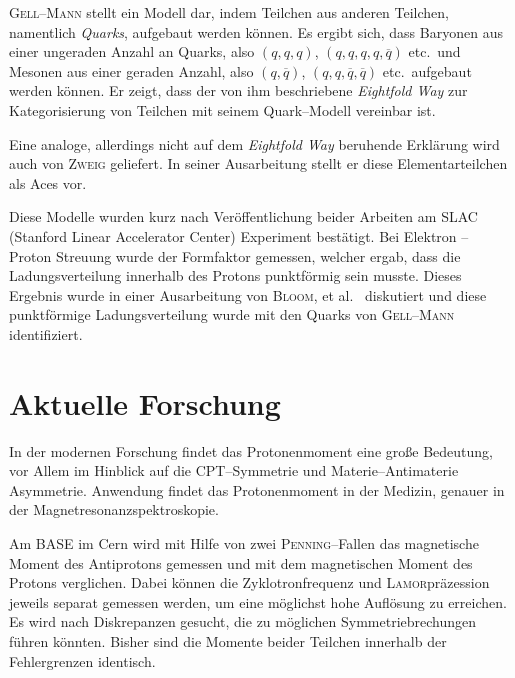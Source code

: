 \documentclass[sn-mathphys-num,iicol]{sn-jnl}
\theoremstyle{thmstyleone}
\theoremstyle{thmstyletwo}
\theoremstyle{thmstylethree}
\begin{document}
\textsc{Gell--Mann}\cite{Gellmann1964} stellt ein Modell dar, indem Teilchen aus anderen Teilchen, namentlich \textit{Quarks}, aufgebaut werden können.
Es ergibt sich, dass Baryonen aus einer ungeraden Anzahl an Quarks, also $\left(q,q,q\right)$, $\left(q,q,q,q,\overline{q}\right)$ etc.\ und Mesonen aus einer geraden Anzahl, also $\left(q,\overline{q}\right)$, $\left(q,q,\overline{q},\overline{q}\right)$ etc.\ aufgebaut werden können.
Er zeigt, dass der von ihm beschriebene \textit{Eightfold Way} zur Kategorisierung von Teilchen mit seinem Quark--Modell vereinbar ist.

Eine analoge, allerdings nicht auf dem \textit{Eightfold Way} beruhende Erklärung wird auch von \textsc{Zweig}\cite{Zweig1964} geliefert.
In seiner Ausarbeitung stellt er diese Elementarteilchen als Aces vor.

Diese Modelle wurden kurz nach Veröffentlichung beider Arbeiten am SLAC (Stanford Linear Accelerator Center) Experiment bestätigt.\cite{Bloom1969}
Bei Elektron -- Proton Streuung wurde der Formfaktor gemessen, welcher ergab, dass die Ladungsverteilung innerhalb des Protons punktförmig sein musste.
Dieses Ergebnis wurde in einer Ausarbeitung von \textsc{Bloom}, et al.\ \cite{Bloom1969} diskutiert und diese punktförmige Ladungsverteilung wurde mit den Quarks von \textsc{Gell--Mann} identifiziert.

\section{Aktuelle Forschung}
In der modernen Forschung findet das Protonenmoment eine große Bedeutung, vor Allem im Hinblick auf die CPT--Symmetrie und Materie--Antimaterie Asymmetrie.
Anwendung findet das Protonenmoment in der Medizin, genauer in der Magnetresonanzspektroskopie.

Am BASE im Cern\cite{BASE2017} wird mit Hilfe von zwei \textsc{Penning}--Fallen das magnetische Moment des Antiprotons gemessen und mit dem magnetischen Moment des Protons verglichen.
Dabei können die Zyklotronfrequenz und \textsc{Lamor}präzession jeweils separat gemessen werden, um eine möglichst hohe Auflösung zu erreichen.
Es wird nach Diskrepanzen gesucht, die zu möglichen Symmetriebrechungen führen könnten.
Bisher sind die Momente beider Teilchen innerhalb der Fehlergrenzen identisch.
\end{document}
